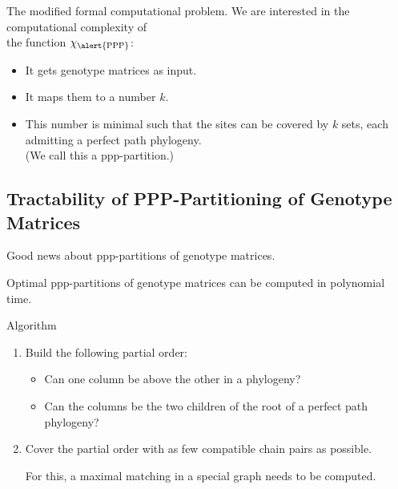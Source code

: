 \documentclass[aspectratio=169]{beamer}
\begin{document}
\begin{frame}{The modified formal computational problem.}
  We are interested in the computational complexity of \\
  the function $\chi_{\alert{\operatorname{PPP}}}$:
  \begin{itemize}
  \item It gets genotype matrices as input.
  \item It maps them to a number $k$.
  \item This number is minimal such that the sites can be
    covered by $k$ sets, each admitting a perfect \alert{path} phylogeny.
    \\
    (We call this a ppp-partition.)
  \end{itemize}
\end{frame}



\subsection{Tractability of PPP-Partitioning of Genotype Matrices}

\begin{frame}{Good news about ppp-partitions of genotype matrices.}
  \begin{theorem}
    \alert{Optimal ppp-partitions of genotype matrices} can be
    computed in \alert{polynomial time}. 
  \end{theorem}
  \begin{block}{Algorithm}
    \begin{enumerate}
    \item Build the following partial order:
      \begin{itemize}
      \item Can one column be above the other in a phylogeny?
      \item Can the columns be the two children of the root of a
        perfect path phylogeny?
      \end{itemize}
    \item Cover the partial order with as few compatible chain pairs 
      as possible. 

      For this, a maximal matching in a special graph needs to be
      computed.
    \end{enumerate}
  \end{block}
  \hyperlink{algorithm<1>}{}
  \hypertarget{return}{}
\end{frame}
\end{document}
